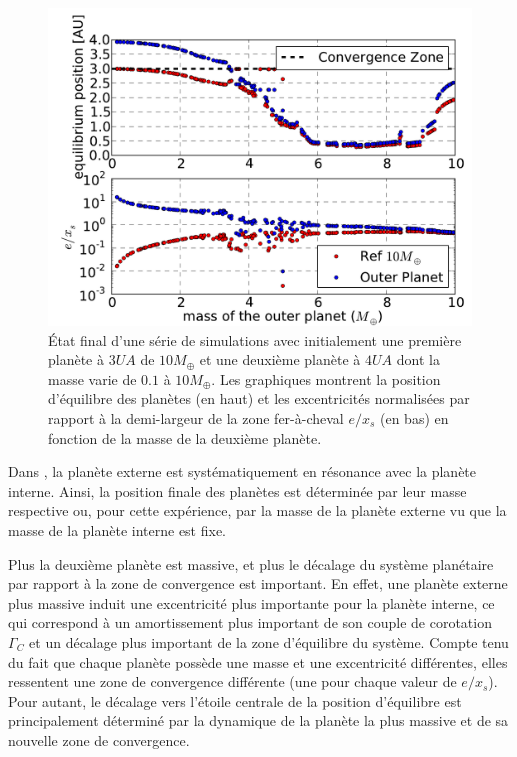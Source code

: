 \begin{figure}[htbp]
\centering
\includegraphics[width=0.95\linewidth]{figure/shifted/mass_ratio_influence.pdf}
\caption[Influence du rapport de masse sur le décalage de la zone d'équilibre d'un système résonnant.]{État final d'une série de
simulations avec initialement une première planète à $3\unit{UA}$ de $10\unit{M_\oplus}$ et une deuxième planète à $4\unit{UA}$
dont la masse varie de $0.1$ à $10\unit{M_\oplus}$. Les graphiques montrent la position d'équilibre des planètes (en haut) et les
excentricités normalisées par rapport à la demi-largeur de la zone fer-à-cheval $e/x_s$ (en bas) en fonction de la masse de la
deuxième planète.}\label{fig:mass_ratio_final_pos}
\end{figure}%

\bigskip

Dans , la planète externe est systématiquement en résonance  avec la planète interne. Ainsi, la position finale des planètes est déterminée par leur masse respective ou, pour cette expérience, par la masse de la planète externe vu que la masse de la planète interne est fixe. 

Plus la deuxième planète est massive, et plus le décalage du système planétaire par rapport à la zone de convergence est
important. En effet, une planète externe plus massive induit une excentricité plus importante pour la planète interne, ce qui
correspond à un amortissement plus important de son couple de corotation $\Gamma_C$ et un décalage plus important de la zone
d'équilibre du système. Compte tenu du fait que chaque planète possède une masse et une excentricité différentes, elles
ressentent une zone de convergence différente (une pour chaque valeur de $e/x_s$). Pour autant, le décalage vers
l'étoile centrale de la position d'équilibre est principalement déterminé par la dynamique de la planète la plus massive et de
sa nouvelle zone de convergence.

